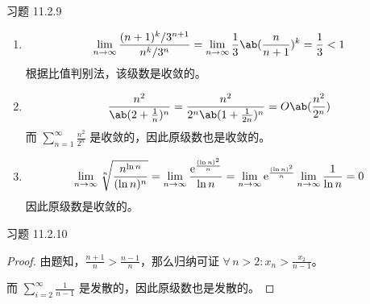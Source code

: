 \begin{problem}
    习题 11.2.9
    \begin{solution}
        \begin{enumerate}
            \item[\textbf{2)}]
            $$
            \lim_{n \to \infty} \frac{(n + 1)^{k} / 3^{n + 1}}{n^{k} / 3^{n}} = \lim_{n \to \infty} \frac{1}{3} \ab(\frac{n}{n + 1})^{k} = \frac{1}{3} < 1
            $$
            根据比值判别法，该级数是收敛的。

            \item[\textbf{3)}]
            $$
            \frac{n^2}{\ab(2 + \frac{1}{n})^{n}} = \frac{n^2}{2^{n} \ab(1 + \frac{1}{2n})^n} = O\ab(\frac{n^2}{2^{n}})
            $$
            而 $\sum\limits_{n = 1}^{\infty} \frac{n^2}{2^{n}}$ 是收敛的，因此原级数也是收敛的。

            \item[\textbf{5)}]
            $$
            \lim_{n \to \infty} \sqrt[n]{\frac{n^{\ln n}}{(\ln n)^{n}}} = \lim_{n \to \infty} \frac{\mathrm{e}^{\frac{(\ln n)^2}{n}}}{\ln n} = \lim_{n \to \infty} \mathrm{e}^{\frac{(\ln n)^2}{n}} \lim_{n \to \infty} \frac{1}{\ln n} = 0
            $$
            因此原级数是收敛的。
        \end{enumerate}
    \end{solution}
\end{problem}

\begin{problem}
    习题 11.2.10
    \begin{proof}
        由题知，$\frac{n + 1}{n} > \frac{n - 1}{n}$，那么归纳可证 $\forall\,n > 2: x_n > \frac{x_2}{n - 1}$。

        而 $\sum_{i = 2}^{\infty} \frac{1}{n - 1}$ 是发散的，因此原级数也是发散的。
    \end{proof}
\end{problem}

